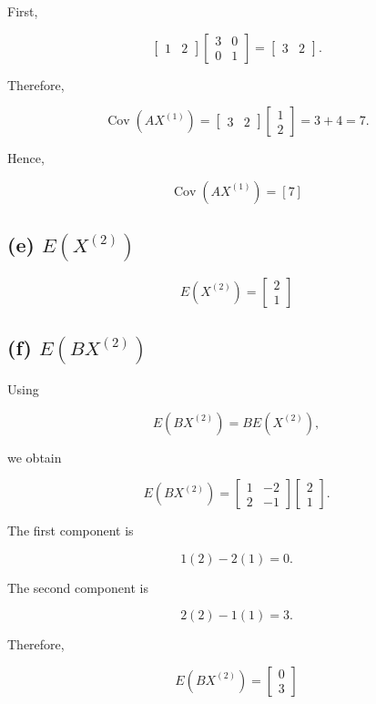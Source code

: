 \documentclass[12pt]{article}
\begin{document}
First,

\[
\begin{bmatrix}
1&2
\end{bmatrix}
\begin{bmatrix}
3&0\\
0&1
\end{bmatrix}
=
\begin{bmatrix}
3&2
\end{bmatrix}.
\]

Therefore,

\[
\operatorname{Cov}(AX^{(1)})
=
\begin{bmatrix}
3&2
\end{bmatrix}
\begin{bmatrix}
1\\
2
\end{bmatrix}
=
3+4
=
7.
\]

Hence,

\[
\boxed{
\operatorname{Cov}(AX^{(1)})=[7]
}
\]

\subsection*{(e) $E(X^{(2)})$}

\[
\boxed{
E(X^{(2)})
=
\begin{bmatrix}
2\\
1
\end{bmatrix}}
\]

\subsection*{(f) $E(BX^{(2)})$}

Using

\[
E(BX^{(2)})
=
BE(X^{(2)}),
\]

we obtain

\[
E(BX^{(2)})
=
\begin{bmatrix}
1&-2\\
2&-1
\end{bmatrix}
\begin{bmatrix}
2\\
1
\end{bmatrix}.
\]

The first component is

\[
1(2)-2(1)=0.
\]

The second component is

\[
2(2)-1(1)=3.
\]

Therefore,

\[
\boxed{
E(BX^{(2)})
=
\begin{bmatrix}
0\\
3
\end{bmatrix}}
\]
\end{document}
